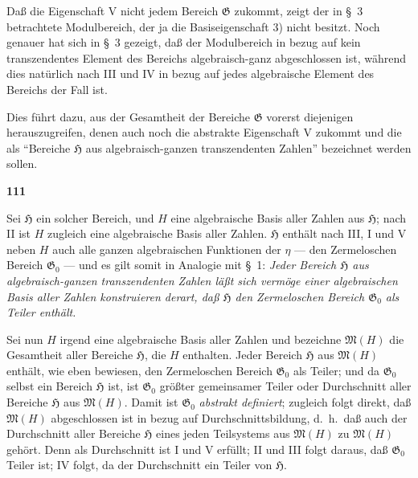 \documentclass[12pt,a4paper]{article}
\begin{document}
Da\ss{} die Eigenschaft V nicht jedem Bereich $\mathfrak{G}$ zukommt, zeigt der in \S\ 3 betrachtete Modulbereich, der ja die Basiseigenschaft 3) nicht besitzt. Noch genauer hat sich in \S\ 3 gezeigt, da\ss{} der Modulbereich in bezug auf kein transzendentes Element des Bereichs algebraisch-ganz abgeschlossen ist, w\"ahrend dies nat\"urlich nach III und IV in bezug auf jedes algebraische Element des Bereichs der Fall ist.

Dies f\"uhrt dazu, aus der Gesamtheit der Bereiche $\mathfrak{G}$ vorerst diejenigen herauszugreifen, denen auch noch die abstrakte Eigenschaft V zukommt und die als ``Bereiche $\mathfrak{H}$ aus algebraisch-ganzen transzendenten Zahlen'' bezeichnet werden sollen.

\newpage
\begin{center}
\textbf{111}
\end{center}

Sei $\mathfrak{H}$ ein solcher Bereich, und $H$ eine algebraische Basis aller Zahlen aus $\mathfrak{H}$; nach II ist $H$ zugleich eine algebraische Basis aller Zahlen. $\mathfrak{H}$ enth\"alt nach III, I und V neben $H$ auch alle ganzen algebraischen Funktionen der $\eta$ --- den Zermeloschen Bereich $\mathfrak{G}_0$ --- und es gilt somit in Analogie mit \S\ 1: \emph{Jeder Bereich $\mathfrak{H}$ aus algebraisch-ganzen transzendenten Zahlen l\"a\ss t sich verm\"oge einer algebraischen Basis aller Zahlen konstruieren derart, da\ss{} $\mathfrak{H}$ den Zermeloschen Bereich $\mathfrak{G}_0$ als Teiler enth\"alt.}

Sei nun $H$ irgend eine algebraische Basis aller Zahlen und bezeichne $\mathfrak{M}(H)$ die Gesamtheit aller Bereiche $\mathfrak{H}$, die $H$ enthalten. Jeder Bereich $\mathfrak{H}$ aus $\mathfrak{M}(H)$ enth\"alt, wie eben bewiesen, den Zermeloschen Bereich $\mathfrak{G}_0$ als Teiler; und da $\mathfrak{G}_0$ selbst ein Bereich $\mathfrak{H}$ ist, ist $\mathfrak{G}_0$ gr\"o\ss ter gemeinsamer Teiler oder Durchschnitt aller Bereiche $\mathfrak{H}$ aus $\mathfrak{M}(H)$. Damit ist $\mathfrak{G}_0$ \emph{abstrakt definiert}; zugleich folgt direkt, da\ss{} $\mathfrak{M}(H)$ abgeschlossen ist in bezug auf Durchschnittsbildung, d.\ h.\ da\ss{} auch der Durchschnitt aller Bereiche $\mathfrak{H}$ eines jeden Teilsystems aus $\mathfrak{M}(H)$ zu $\mathfrak{M}(H)$ geh\"ort. Denn als Durchschnitt ist I und V erf\"ullt; II und III folgt daraus, da\ss{} $\mathfrak{G}_0$ Teiler ist; IV folgt, da der Durchschnitt ein Teiler von $\mathfrak{H}$.
\end{document}
